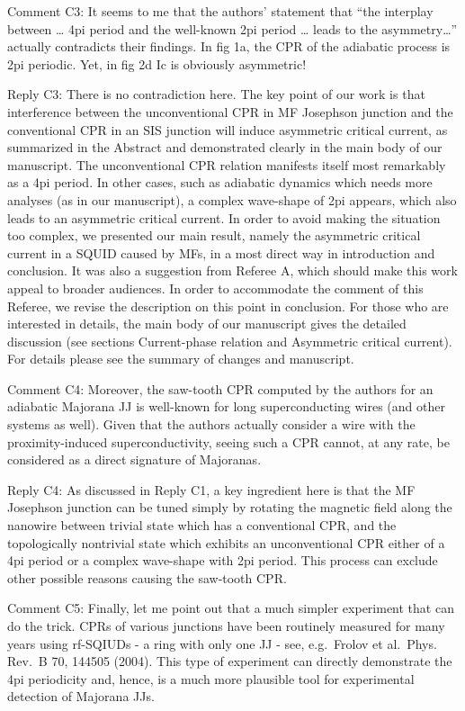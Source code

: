 \documentclass[11pt]{article}
\begin{document}
Comment C3: It seems to me that the authors' statement that ``the
interplay between \ldots{} 4pi period and the well-known 2pi period
\ldots{} leads to the asymmetry\ldots{}'' actually contradicts their
findings. In fig 1a, the CPR of the adiabatic process is 2pi periodic.
Yet, in fig 2d Ic is obviously asymmetric!

Reply C3: There is no contradiction here. The key point of our work is
that interference between the unconventional CPR in MF Josephson
junction and the conventional CPR in an SIS junction will induce
asymmetric critical current, as summarized in the Abstract and
demonstrated clearly in the main body of our manuscript. The
unconventional CPR relation manifests itself most remarkably as a 4pi
period. In other cases, such as adiabatic dynamics which needs more
analyses (as in our manuscript), a complex wave-shape of 2pi appears,
which also leads to an asymmetric critical current. In order to avoid
making the situation too complex, we presented our main result, namely
the asymmetric critical current in a SQUID caused by MFs, in a most
direct way in introduction and conclusion. It was also a suggestion from
Referee A, which should make this work appeal to broader audiences. In
order to accommodate the comment of this Referee, we revise the
description on this point in conclusion. For those who are interested in
details, the main body of our manuscript gives the detailed discussion
(see sections Current-phase relation and Asymmetric critical current).
For details please see the summary of changes and manuscript.

Comment C4: Moreover, the saw-tooth CPR computed by the authors for an
adiabatic Majorana JJ is well-known for long superconducting wires (and
other systems as well). Given that the authors actually consider a wire
with the proximity-induced superconductivity, seeing such a CPR cannot,
at any rate, be considered as a direct signature of Majoranas.

Reply C4: As discussed in Reply C1, a key ingredient here is that the MF
Josephson junction can be tuned simply by rotating the magnetic field
along the nanowire between trivial state which has a conventional CPR,
and the topologically nontrivial state which exhibits an unconventional
CPR either of a 4pi period or a complex wave-shape with 2pi period. This
process can exclude other possible reasons causing the saw-tooth CPR.

Comment C5: Finally, let me point out that a much simpler experiment
that can do the trick. CPRs of various junctions have been routinely
measured for many years using rf-SQIUDs - a ring with only one JJ - see,
e.g.~Frolov et al.~Phys. Rev.~B 70, 144505 (2004). This type of
experiment can directly demonstrate the 4pi periodicity and, hence, is a
much more plausible tool for experimental detection of Majorana JJs.
\end{document}
